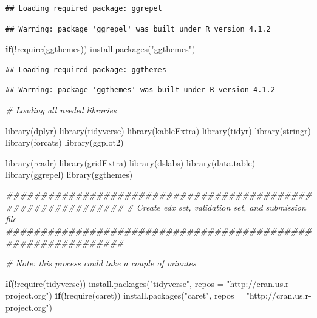 \documentclass[
]{article}
\newenvironment{Shaded}{}{}
\newcommand{\AttributeTok}[1]{\textcolor[rgb]{0.49,0.56,0.16}{#1}}
\newcommand{\CommentTok}[1]{\textcolor[rgb]{0.38,0.63,0.69}{\textit{#1}}}
\newcommand{\ControlFlowTok}[1]{\textcolor[rgb]{0.00,0.44,0.13}{\textbf{#1}}}
\newcommand{\DocumentationTok}[1]{\textcolor[rgb]{0.73,0.13,0.13}{\textit{#1}}}
\newcommand{\FunctionTok}[1]{\textcolor[rgb]{0.02,0.16,0.49}{#1}}
\newcommand{\NormalTok}[1]{#1}
\newcommand{\SpecialCharTok}[1]{\textcolor[rgb]{0.25,0.44,0.63}{#1}}
\newcommand{\StringTok}[1]{\textcolor[rgb]{0.25,0.44,0.63}{#1}}
\begin{document}
\begin{verbatim}
## Loading required package: ggrepel
\end{verbatim}

\begin{verbatim}
## Warning: package 'ggrepel' was built under R version 4.1.2
\end{verbatim}

\begin{Shaded}
\begin{Highlighting}[]
\ControlFlowTok{if}\NormalTok{(}\SpecialCharTok{!}\FunctionTok{require}\NormalTok{(ggthemes)) }\FunctionTok{install.packages}\NormalTok{(}\StringTok{"ggthemes"}\NormalTok{)}
\end{Highlighting}
\end{Shaded}

\begin{verbatim}
## Loading required package: ggthemes
\end{verbatim}

\begin{verbatim}
## Warning: package 'ggthemes' was built under R version 4.1.2
\end{verbatim}

\begin{Shaded}
\begin{Highlighting}[]
\CommentTok{\# Loading all needed libraries}

\FunctionTok{library}\NormalTok{(dplyr)}
\FunctionTok{library}\NormalTok{(tidyverse)}
\FunctionTok{library}\NormalTok{(kableExtra)}
\FunctionTok{library}\NormalTok{(tidyr)}
\FunctionTok{library}\NormalTok{(stringr)}
\FunctionTok{library}\NormalTok{(forcats)}
\FunctionTok{library}\NormalTok{(ggplot2)}

\FunctionTok{library}\NormalTok{(readr)}
\FunctionTok{library}\NormalTok{(gridExtra)}
\FunctionTok{library}\NormalTok{(dslabs)}
\FunctionTok{library}\NormalTok{(data.table)}
\FunctionTok{library}\NormalTok{(ggrepel)}
\FunctionTok{library}\NormalTok{(ggthemes)}

\DocumentationTok{\#\#\#\#\#\#\#\#\#\#\#\#\#\#\#\#\#\#\#\#\#\#\#\#\#\#\#\#\#\#\#\#\#\#\#\#\#\#\#\#\#\#\#\#\#\#\#\#\#\#\#\#\#\#\#\#\#\#\#\#\#}
\CommentTok{\# Create edx set, validation set, and submission file}
\DocumentationTok{\#\#\#\#\#\#\#\#\#\#\#\#\#\#\#\#\#\#\#\#\#\#\#\#\#\#\#\#\#\#\#\#\#\#\#\#\#\#\#\#\#\#\#\#\#\#\#\#\#\#\#\#\#\#\#\#\#\#\#\#\#}

\CommentTok{\# Note: this process could take a couple of minutes}

\ControlFlowTok{if}\NormalTok{(}\SpecialCharTok{!}\FunctionTok{require}\NormalTok{(tidyverse)) }\FunctionTok{install.packages}\NormalTok{(}\StringTok{"tidyverse"}\NormalTok{, }\AttributeTok{repos =} \StringTok{"http://cran.us.r{-}project.org"}\NormalTok{)}
\ControlFlowTok{if}\NormalTok{(}\SpecialCharTok{!}\FunctionTok{require}\NormalTok{(caret)) }\FunctionTok{install.packages}\NormalTok{(}\StringTok{"caret"}\NormalTok{, }\AttributeTok{repos =} \StringTok{"http://cran.us.r{-}project.org"}\NormalTok{)}
\end{Highlighting}
\end{Shaded}
\end{document}
